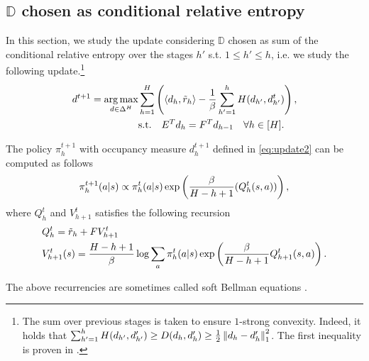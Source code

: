 \subsection{$\mathbb{D}$ chosen as conditional relative entropy \cite{neu2017unified}}
In this section, we study the update considering $\mathbb{D}$ chosen as sum of the conditional relative entropy over the stages $h'$ s.t. $1 \leq h' \leq h$, i.e. we study the following update.\footnote{The sum over previous stages is taken to ensure $1$-strong convexity. Indeed, it holds that $\sum^h_{h'=1} H(d_{h'},d'_{h'}) \geq D(d_h,d'_h) \geq \frac{1}{2}\left\lVert d_h - d'_h\right\rVert^2_1$. The first inequality is proven in \citet[Lemma 7]{neu2021online}. }
\begin{align}
d^{t+1} = \operatorname*{arg\,max}_{d\in\Delta^H} &\sum^H_{h=1}\left({\left\langle{d_h},{\tilde{r}_h}\right\rangle - \frac{1}{\beta} \sum^h_{h'=1}H(d_{h'},d_{h'}^t)}\right), \nonumber \\
&\text{s.t.} \quad E^T d_h = F^T d_{h-1} \quad \forall h \in [H].\label{eq:update2}
\end{align}
\begin{theorem} \label{thm:updateV_bis}
    The policy $\pi^{t+1}_h$ with occupancy measure $d^{t+1}_{h}$ defined in \cref{eq:update2} can be computed as follows 
    \begin{align*}
        \pi^{t+1}_h(a|s) \propto \pi^t_h(a|s) \exp\left({\frac{\beta}{H-h+1}(Q^t_{h}(s,a))}\right),
    \end{align*}
    where $Q^t_{h}$ and $V^t_{h+1}$ satisfies the following recursion
    \begin{align*}
        &Q^t_{h} = \tilde{r}_h + F V^t_{h+1} \\
        &V^t_{h+1}(s) = \frac{H-h+1}{\beta}\log \sum_a \pi^t_h(a|s) \exp\left({\frac{\beta}{H-h+1} Q^t_{h+1}(s,a)}\right).
    \end{align*}
\end{theorem}
    \begin{remark}
    The above recurrencies are sometimes called soft Bellman equations \cite{ziebart2010modeling,fox2015taming}.
\end{remark}
